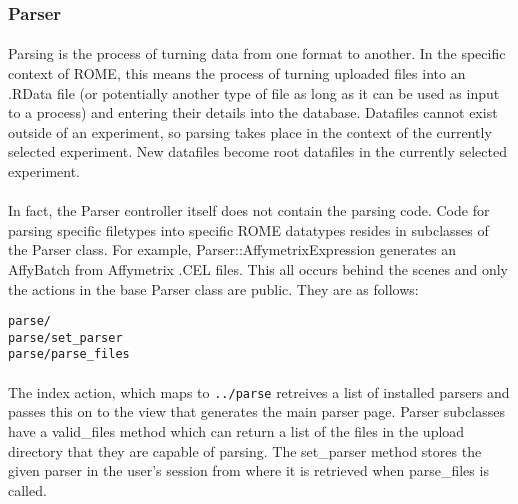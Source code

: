\subsubsection{Parser}
\label{sec:controller_parser}

\paragraph{}
Parsing is the process of turning data from one format to another. In the specific context of ROME, this means the process of turning uploaded files into an .RData file (or potentially another type of file as long as it can be used as input to a process) and entering their details into the database. Datafiles cannot exist outside of an experiment, so parsing takes place in the context of the currently selected experiment. New datafiles become root datafiles in the currently selected experiment.

\paragraph*{}
In fact, the Parser controller itself does not contain the parsing code. Code for parsing specific filetypes into specific ROME datatypes resides in subclasses of the Parser class. For example, Parser::AffymetrixExpression generates an AffyBatch from Affymetrix .CEL files. This all occurs behind the scenes and only the actions in the base Parser class are public. They are as follows:

\begin{scriptsize}
\begin{verbatim}
parse/
parse/set_parser
parse/parse_files
\end{verbatim}
\end{scriptsize}

\paragraph{}
The index action, which maps to \texttt{../parse} retreives a list of installed parsers and passes this on to the view that generates the main parser page. Parser subclasses have a valid\_files method which can return a list of the files in the upload directory that they are capable of parsing. The set\_parser method stores the given parser in the user's session from where it is retrieved when parse\_files is called.






